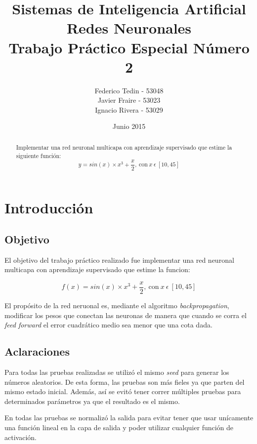 \documentclass[11pt,a4paper]{article}
\title{Sistemas de Inteligencia Artificial\\Redes Neuronales\\Trabajo Práctico Especial Número 2}
\date{Junio 2015}
\author{Federico Tedin - 53048\\Javier Fraire - 53023\\Ignacio Rivera - 53029}
\begin{document}
\maketitle
\thispagestyle{empty}

\vspace{5mm}
\renewcommand{\abstractname}{Resumen:}
\begin{abstract}

\centering
Implementar una red neuronal multicapa con aprendizaje supervisado que estime la siguiente función:
$$ y = sin(x) \times x^3 + \frac{x}{2}, \ \text{con} \ x \ \epsilon \ [10, 45] $$
\end{abstract}

\clearpage

\renewcommand{\contentsname}{Índice}
\tableofcontents
\thispagestyle{empty}
\clearpage
\setcounter{page}{1}

\section{Introducción}
\subsection{Objetivo}

El objetivo del trabajo práctico realizado fue implementar una red neuronal multicapa con aprendizaje supervisado que estime la funcion:

$$ f(x) = sin(x) \times x^3 + \frac{x}{2}, \ \text{con} \ x \ \epsilon \ [10, 45] $$

El propósito de la red neruonal es, mediante el algoritmo \emph{backpropagation}, modificar los pesos que conectan las neuronas de manera que cuando se corra el \emph{feed forward} el error cuadrático medio sea menor que una cota dada.

\subsection{Aclaraciones}

Para todas las pruebas realizadas se utilizó el mismo \emph{seed} para generar los números aleatorios. De esta forma, las pruebas son más fieles ya que parten del mismo estado inicial. Además, así se evitó tener correr múltiples pruebas para determinados parámetros ya que el resultado es el mismo. 

En todas las pruebas se normalizó la salida para evitar tener que usar unícamente una función lineal en la capa de salida y poder utilizar cualquier función de activación.
\end{document}
